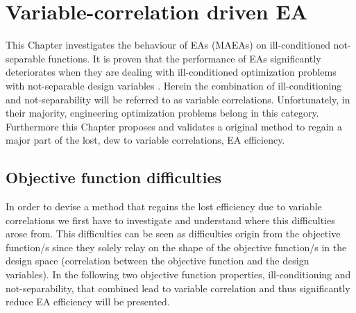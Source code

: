 \ifpdf
    \graphicspath{{4/figures/PNG/}{4/figures/PDF/}{3/figures/}}
\else
    \graphicspath{{4/figures/EPS/}{4/figures/}}
\fi

\chapter{Variable-correlation driven EA} %
\label{VarCorrChapter}

This Chapter investigates the behaviour of EAs (MAEAs) on ill-conditioned not-separable functions. It is proven that the performance of EAs significantly deteriorates when they are dealing with ill-conditioned optimization problems with not-separable design variables \cite{Salomon,Roy_2002a,Ghisu_2010}. Herein the combination of ill-conditioning and not-separability will be referred to as variable correlations. Unfortunately, in their majority, engineering optimization problems belong in this category. Furthermore this Chapter proposes and validates a original method to regain a major part of the lost, dew to variable correlations, EA efficiency.  

\section{Objective function difficulties}
In order to devise a method that regains the lost efficiency due to variable correlations we first have to investigate and understand where this difficulties arose from. This difficulties can be seen as difficulties origin from the objective function/s since they solely relay on the shape of the objective function/s in the design space (correlation between the objective function and the design variables). In the following two objective function properties, ill-conditioning and not-separability, that combined lead to variable correlation and thus significantly reduce EA efficiency will be presented.

